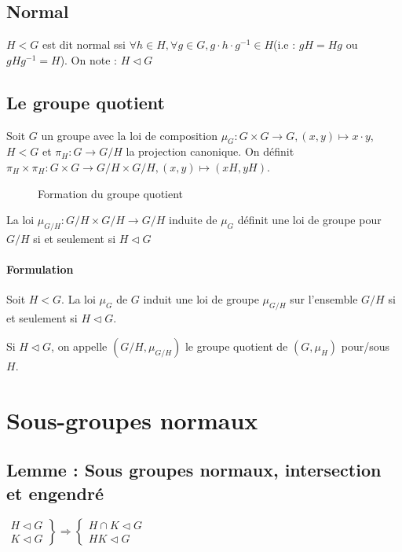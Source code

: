 \documentclass[a4paper,10pt]{report}
\newcommand{\so}{\Rightarrow}
\newcommand{\mfootnote}[1]{\up{(}\footnote{#1}\up{)}}
\begin{document}
   \subsection{Normal}
    $H < G$ est dit normal ssi $\forall h \in H, \forall g \in G, g\cdot h \cdot
    g^{-1} \in H$(i.e : $gH=Hg$ ou $gHg^{-1}=H$). On note : $H \triangleleft G$

   \subsection{Le groupe quotient}
    Soit $G$ un groupe avec la loi de composition $\mu_G : G \times G \to G,
    (x,y) \mapsto x\cdot y$, $H < G$ et $\pi_H: G \to G/H$ la projection
    canonique. On définit $\pi_H \times \pi_H : G\times G \to G/H \times G/H,
    (x,y) \mapsto (xH,yH)$.
    \begin{figure}[htb]
      \begin{center}
	
      \end{center}
      \caption{Formation du groupe quotient}
      \label{fig:quot}
    \end{figure}

    La loi $\mu_{G/H}:G/H \times G/H \to G/H$ induite de $\mu_G$ définit
    une loi de groupe pour $G/H$ si et seulement si $H \triangleleft G$

    \paragraph{Formulation} Soit $H < G$. La loi $\mu_G$ de $G$ induit
    une loi de groupe $\mu_{G/H}$ sur l'ensemble $G/H$ si et seulement
    si $H \triangleleft G$.
    \begin{comment}
      \mfootnote{Preuve : CM 09/10/08 p1 verso + p2 verso}
    \end{comment}

    Si $H \triangleleft G$, on appelle $(G/H, \mu_{G/H})$ le groupe quotient de
    $(G,\mu_H)$ pour/sous $H$.

  \section{Sous-groupes normaux}
   \subsection{Lemme : Sous groupes normaux, intersection et engendré}
    $\left.
    \begin{array}{r}
      H \triangleleft G\\
      K \triangleleft G
    \end{array}\right\}
    \so
    \begin{cases}
      H \cap K \triangleleft G\\
      HK \triangleleft G
    \end{cases}$
    \begin{comment}
      \mfootnote{Preuve : CM 15/10/08 p1 recto}
    \end{comment}
\end{document}
